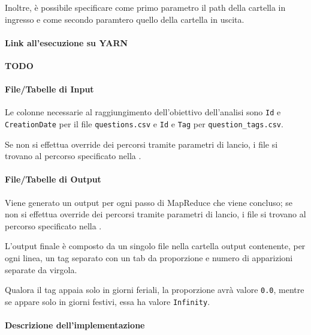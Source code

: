   Inoltre, è possibile specificare come primo parametro il path della cartella in ingresso e come secondo paramtero quello della cartella in uscita.

  \paragraph{Link all'esecuzione su YARN}\label{par:job1:mapreduce:yarn}

  \textbf{TODO}

  \paragraph{File/Tabelle di Input}\label{par:job1:mapreduce:input}

  Le colonne necessarie al raggiungimento dell'obiettivo dell'analisi sono \texttt{Id} e \texttt{CreationDate} per il file \texttt{questions.csv}
  e \texttt{Id} e \texttt{Tag} per \texttt{question\_tags.csv}.

  Se non si effettua override dei percorsi tramite parametri di lancio, i file si trovano al percorso specificato nella .

  \paragraph{File/Tabelle di Output}\label{par:job1:mapreduce:output}

  Viene generato un output per ogni passo di MapReduce che viene concluso;
  se non si effettua override dei percorsi tramite parametri di lancio, i file si trovano al percorso specificato nella .

  L'output finale è composto da un singolo file nella cartella output contenente, per ogni linea, un tag separato con un tab da proporzione e numero di apparizioni separate da virgola.

  Qualora il tag appaia solo in giorni feriali, la proporzione avrà valore \texttt{0.0}, mentre se appare solo in giorni festivi, essa ha valore \texttt{Infinity}.

  \paragraph{Descrizione dell'implementazione}\label{par:job1:mapreduce:implementation}


